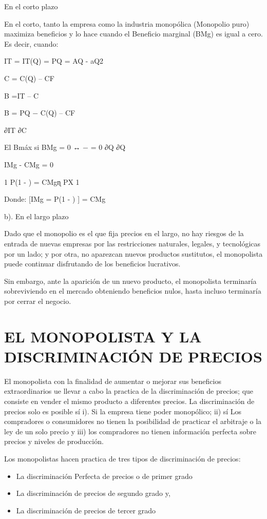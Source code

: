 \documentclass[
  letterpaper,
  DIV=11,
  numbers=noendperiod]{scrartcl}
\begin{document}
En el corto plazo

En el corto, tanto la empresa como la industria monopólica (Monopolio
puro) maximiza beneficios y lo hace cuando el Beneficio marginal (BMg)
es igual a cero. Es decir, cuando:

IT = IT(Q) = PQ = AQ - aQ2

C = C(Q) -- CF

B =IT -- C

B = PQ − C(Q) -- CF

∂IT ∂C

El Bmáx si BMg = 0 ↔ − = 0 ∂Q ∂Q

IMg - CMg = 0

1 P(1 - ) = CMgɳ PX 1

Donde: {[}IMg = P(1 - ) {]} = CMg

b). En el largo plazo

Dado que el monopolio es el que fija precios en el largo, no hay riesgos
de la entrada de nuevas empresas por las restricciones naturales,
legales, y tecnológicas por un lado; y por otra, no aparezcan nuevos
productos sustitutos, el monopolista puede continuar disfrutando de los
beneficios lucrativos.

Sin embargo, ante la aparición de un nuevo producto, el monopolista
terminaría sobreviviendo en el mercado obteniendo beneficios nulos,
hasta incluso terminaría por cerrar el negocio.

\hypertarget{el-monopolista-y-la-discriminaciuxf3n-de-precios}{%
\section{EL MONOPOLISTA Y LA DISCRIMINACIÓN DE
PRECIOS}\label{el-monopolista-y-la-discriminaciuxf3n-de-precios}}

El monopolista con la finalidad de aumentar o mejorar sus beneficios
extraordinarios ue llevar a cabo la practica de la discriminación de
precios; que consiste en vender el mismo producto a diferentes precios.
La discriminación de precios solo es posible sí i). Si la empresa tiene
poder monopólico; ii) sí Los compradores o consumidores no tienen la
posibilidad de practicar el arbitraje o la ley de un solo precio y iii)
los compradores no tienen información perfecta sobre precios y niveles
de producción.

Los monopolistas hacen practica de tres tipos de discriminación de
precios:

\begin{itemize}
\item
  La discriminación Perfecta de precios o de primer grado
\item
  La discriminación de precios de segundo grado y,
\item
  La discriminación de precios de tercer grado
\end{itemize}
\end{document}
